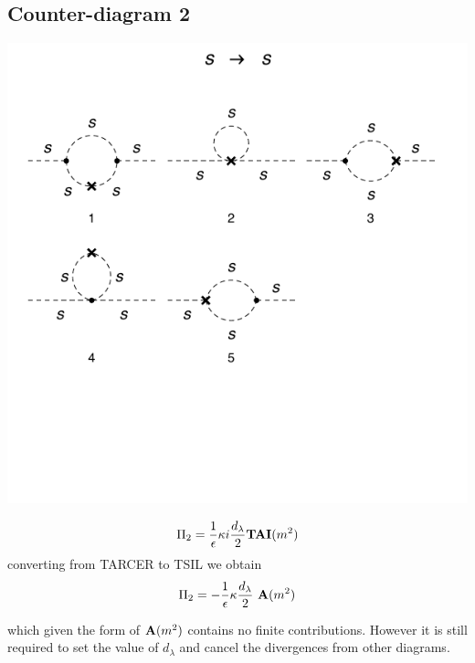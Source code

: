\documentclass[11pt]{article}
\newcommand{\tsil}{\textsf{TSIL} }
\newcommand{\tarcer}{\textsf{TARCER} }
\begin{document}
  \subsection*{Counter-diagram 2}
  \noindent\begin{minipage}{0.3\textwidth}
 \begin{center}
\includegraphics{2loop_2c.pdf}
\end{center}
\end{minipage}
\noindent\begin{minipage}{0.7\textwidth}

 \begin{align}
 \Pi_2 = \frac{ 1 }{\epsilon} \kappa i  \frac{d_{\lambda}}{2} {\tt{\mathbf{TAI}}}(m^2)
 \end{align}
 converting from \tarcer to \tsil we obtain
  \begin{align}
 \Pi_2 = - \frac{ 1 }{\epsilon}\kappa \frac{d_{\lambda}}{2} \ {\tt{\mathbf{A}}}(m^2)
 \end{align}
 \end{minipage}
 which given the form of ${\tt{\mathbf{A}}}(m^2)$ contains no finite contributions.  However it is still required to set the value of $d_{\lambda}$ and cancel the divergences from other diagrams.

 
\end{document}
